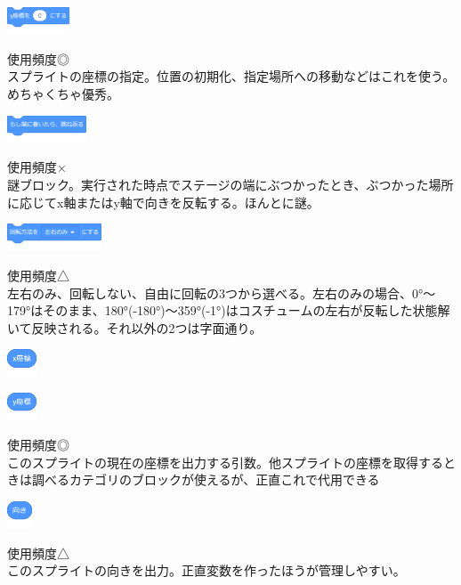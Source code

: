 \documentclass[b5paper,10pt]{jsarticle}
\begin{document}
\begin{multicols*}{3}
\begin{itembox}{10}
\includegraphics[height=8mm]{images/motion_13.png}
\end{itembox}
使用頻度◎\\
スプライトの座標の指定。位置の初期化、指定場所への移動などはこれを使う。めちゃくちゃ優秀。
\begin{itembox}{11}
\includegraphics[height=8mm]{images/motion_14.png}
\end{itembox}
使用頻度×\\
謎ブロック。実行された時点でステージの端にぶつかったとき、ぶつかった場所に応じてx軸またはy軸で向きを反転する。ほんとに謎。
\begin{itembox}{12}
\includegraphics[height=8mm]{images/motion_15.png}
\end{itembox}
使用頻度△\\
左右のみ、回転しない、自由に回転の3つから選べる。左右のみの場合、0°～179°はそのまま、180°(-180°)～359°(-1°)はコスチュームの左右が反転した状態解いて反映される。それ以外の2つは字面通り。
\begin{itembox}{13}
\includegraphics[height=8mm]{images/motion_16.png}

\includegraphics[height=8mm]{images/motion_17.png}
\end{itembox}
使用頻度◎\\
このスプライトの現在の座標を出力する引数。他スプライトの座標を取得するときは調べるカテゴリのブロックが使えるが、正直これで代用できる
\begin{itembox}{14}
\includegraphics[height=8mm]{images/motion_18.png}
\end{itembox}
使用頻度△\\
このスプライトの向きを出力。正直変数を作ったほうが管理しやすい。


\end{multicols*}
\end{document}
